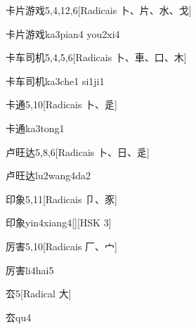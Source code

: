 \begin{entry}{卡片游戏}{5,4,12,6}[Radicais ⼘、⽚、⽔、⼽]
  \begin{phonetics}{卡片游戏}{ka3pian4 you2xi4}
  \end{phonetics}
\end{entry}

\begin{entry}{卡车司机}{5,4,5,6}[Radicais ⼘、⾞、⼝、⽊]
  \begin{phonetics}{卡车司机}{ka3che1 si1ji1}
  \end{phonetics}
\end{entry}

\begin{entry}{卡通}{5,10}[Radicais ⼘、⾡]
  \begin{phonetics}{卡通}{ka3tong1}
  \end{phonetics}
\end{entry}

\begin{entry}{卢旺达}{5,8,6}[Radicais ⼘、⽇、⾡]
  \begin{phonetics}{卢旺达}{lu2wang4da2}
  \end{phonetics}
\end{entry}

\begin{entry}{印象}{5,11}[Radicais ⼙、⾗]
  \begin{phonetics}{印象}{yin4xiang4}[][HSK 3]
  \end{phonetics}
\end{entry}

\begin{entry}{厉害}{5,10}[Radicais ⼚、⼧]
  \begin{phonetics}{厉害}{li4hai5}
  \end{phonetics}
\end{entry}

\begin{entry}{厺}{5}[Radical ⼤]
  \begin{phonetics}{厺}{qu4}
  \end{phonetics}
\end{entry}

